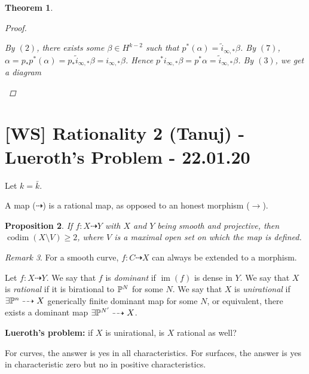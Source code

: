 \documentclass[A4paper, british]{amsart}
\theoremstyle{darkgreentheorem}
\newtheorem{thm}{Theorem}[section]
\newtheorem{prop}[thm]{Proposition}
\theoremstyle{darkbluedefinition}
\theoremstyle{darkredexample}
\theoremstyle{remark}
\newtheorem{rem}[thm]{Remark}
\DeclareMathOperator{\im}{im}
\newcommand{\1}{\mathbbm{1}}
\newcommand{\op}{\oplus}
\begin{document}
\begin{thm}
\begin{proof}
\begin{enumerate}
		By $(2)$, there exists some $\beta \in H^{k-2}$ such that $p^{*}(\alpha)=\tilde{i}_{\infty,*}\beta $.
		By $(7)$, $\alpha=p_{*}p^{*}(\alpha)=p_{*}\tilde{i}_{\infty,*}\beta=i_{\infty,*}\beta$.
		Hence $p^{*}i_{\infty,*}\beta=p^{*}\alpha = \tilde{i}_{\infty,*}\beta$.
		By $(3)$, we get a diagram
		\begin{center}
		\end{center}

	\end{enumerate}
    \end{proof}
\end{thm}

\section{[WS] Rationality 2 (Tanuj) - Lueroth's Problem - 22.01.20}

Let $k=\bar{k}$.

A map ($\dashrightarrow$) is a rational map, as opposed to an honest morphism ($\to$).

\begin{prop}
    If $f\colon X\dashrightarrow Y$ with $X$ and $Y$ being smooth and projective, then $\operatorname{codim}(X\setminus V) \geqslant 2$, where $V$ is a maximal open set on which the map is defined.
\end{prop}

\begin{rem}
    For a smooth curve, $f\colon C\dashrightarrow X$ can always be extended to a morphism.
\end{rem}

Let $f\colon X\dashrightarrow Y$.
We say that $f$ is \textit{dominant} if $\im(f)$ is dense in $Y$.
We say that $X$ is \textit{rational} if it is birational to $\P^{N}$ for some $N$.
We say that $X$ is \textit{unirational} if $\exists \P^{n}\dashrightarrow X$ generically finite dominant map for some $N$, or equivalent, there exists a dominant map $\exists \P^{N'}\dashrightarrow X$.

\textbf{Lueroth's problem:}
if $X$ is unirational, is $X$ rational as well?

For curves, the answer is yes in all characteristics.
For surfaces, the answer is yes in characteristic zero but no in positive characteristics.
\end{document}
